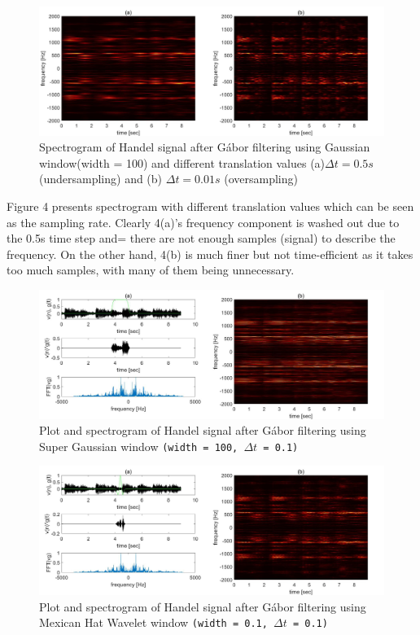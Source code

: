 \documentclass[10pt,a4paper]{article}
\numberwithin{equation}{subsection}
\begin{document}
\begin{figure}[H]
\begin{center}
\includegraphics[scale=0.22]{f4.jpg}
\caption{Spectrogram of Handel signal after G\'abor filtering using Gaussian window(width = 100) and different translation values (a)$\Delta t = 0.5s$ (undersampling) and (b) $\Delta t = 0.01s$ (oversampling)}
\end{center}
\end{figure}

Figure 4 presents spectrogram with different translation values which can be seen as the sampling rate. Clearly 4(a)'s frequency component is washed out due to the 0.5s time step and= there are not enough samples (signal) to describe the frequency. On the other hand, 4(b) is much finer but not time-efficient as it takes too much samples, with many of them being unnecessary.

\begin{figure}[H]
\begin{center}
\includegraphics[scale=0.22]{f5.jpg}
\caption{Plot and spectrogram of Handel signal after G\'abor filtering using Super Gaussian window \texttt{(width = 100, $\Delta t$ = 0.1)}}
\end{center}
\end{figure}

\begin{figure}[H]
\begin{center}
\includegraphics[scale=0.22]{f6.jpg}
\caption{Plot and spectrogram of Handel signal after G\'abor filtering using Mexican Hat Wavelet window \texttt{(width = 0.1, $\Delta t$ = 0.1)}}
\end{center}
\end{figure}
	
\end{document}
